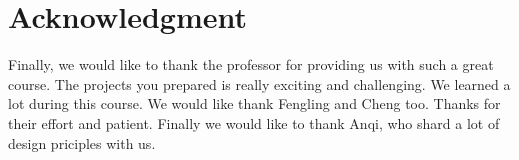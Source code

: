 \documentclass[conference,compsoc]{IEEEtran}
\begin{document}
\section*{Acknowledgment}
	Finally, we would like to thank the professor for providing us with such a great course.
	The projects you prepared is really exciting and challenging. 
	We learned a lot during this course.
	We would like thank Fengling and Cheng too. 
	Thanks for their effort and patient.
	Finally we would like to thank Anqi, who shard a lot of design priciples with us.





\end{document}
